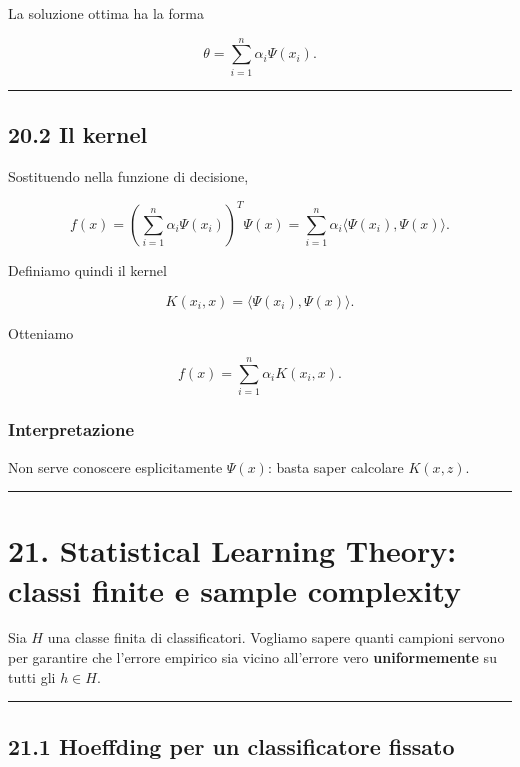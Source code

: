\documentclass{article}
\begin{document}
La soluzione ottima ha la forma

\[
\theta = \sum_{i=1}^n \alpha_i \Psi(x_i).
\]

\begin{center}\rule{0.5\linewidth}{0.5pt}\end{center}

\subsection{20.2 Il kernel}\label{il-kernel}

Sostituendo nella funzione di decisione,

\[
f(x)
=
\left(\sum_{i=1}^n \alpha_i \Psi(x_i)\right)^T \Psi(x)
=
\sum_{i=1}^n \alpha_i \langle \Psi(x_i),\Psi(x)\rangle.
\]

Definiamo quindi il kernel

\[
K(x_i,x)=\langle \Psi(x_i),\Psi(x)\rangle.
\]

Otteniamo

\[
f(x)=\sum_{i=1}^n \alpha_i K(x_i,x).
\]

\subsubsection{Interpretazione}\label{interpretazione-7}

Non serve conoscere esplicitamente \(\Psi(x)\): basta saper calcolare
\(K(x,z)\).

\begin{center}\rule{0.5\linewidth}{0.5pt}\end{center}

\section{21. Statistical Learning Theory: classi finite e sample
complexity}\label{statistical-learning-theory-classi-finite-e-sample-complexity}

Sia \(H\) una classe finita di classificatori. Vogliamo sapere quanti
campioni servono per garantire che l'errore empirico sia vicino
all'errore vero \textbf{uniformemente} su tutti gli \(h\in H\).

\begin{center}\rule{0.5\linewidth}{0.5pt}\end{center}

\subsection{21.1 Hoeffding per un classificatore
fissato}\label{hoeffding-per-un-classificatore-fissato}
\end{document}
